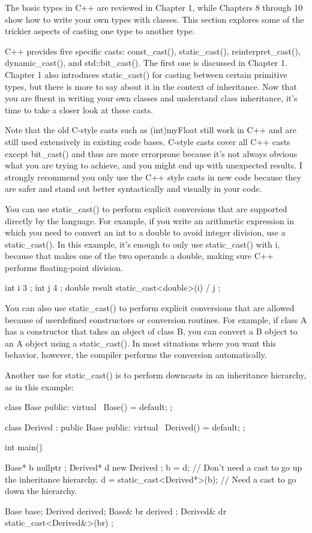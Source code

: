 
The basic types in C++ are reviewed in Chapter 1, while Chapters 8 through 10 show how to write your own types with classes. This section explores some of the trickier aspects of casting one type to another type.

C++ provides five specific casts: const\_cast(), static\_cast(), reinterpret\_cast(), dynamic\_cast(), and std::bit\_cast(). The first one is discussed in Chapter 1. Chapter 1 also introduces static\_cast() for casting between certain primitive types, but there is more to say about it in the context of inheritance. Now that you are fluent in writing your own classes and understand class inheritance, it’s time to take a closer look at these casts.

Note that the old C-style casts such as (int)myFloat still work in C++ and are still used extensively in existing code bases. C-style casts cover all C++ casts except bit\_cast() and thus are more errorprone because it’s not always obvious what you are trying to achieve, and you might end up with unexpected results. I strongly recommend you only use the C++ style casts in new code because they are safer and stand out better syntactically and visually in your code.


You can use static\_cast() to perform explicit conversions that are supported directly by the language. For example, if you write an arithmetic expression in which you need to convert an int to a double to avoid integer division, use a static\_cast(). In this example, it’s enough to only use static\_cast() with i, because that makes one of the two operands a double, making sure C++ performs floating-point division.

\begin{cpp}
int i { 3 };
int j { 4 };
double result { static_cast<double>(i) / j };
\end{cpp}

You can also use static\_cast() to perform explicit conversions that are allowed because of userdefined constructors or conversion routines. For example, if class A has a constructor that takes an object of class B, you can convert a B object to an A object using a static\_cast(). In most situations where you want this behavior, however, the compiler performs the conversion automatically.

Another use for static\_cast() is to perform downcasts in an inheritance hierarchy, as in this example:

\begin{cpp}
class Base
{
    public:
        virtual ~Base() = default;
};

class Derived : public Base
{
    public:
        virtual ~Derived() = default;
};

int main()
{
    Base* b { nullptr };
    Derived* d { new Derived {} };
    b = d; // Don't need a cast to go up the inheritance hierarchy.
    d = static_cast<Derived*>(b); // Need a cast to go down the hierarchy.

    Base base;
    Derived derived;
    Base& br { derived };
    Derived& dr { static_cast<Derived&>(br) };
}
\end{cpp}

